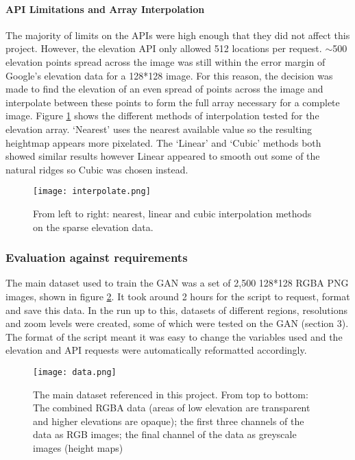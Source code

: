 \documentclass[a4paper]{report}
\begin{document}
\paragraph{API Limitations and Array Interpolation}
The majority of limits on the APIs were high enough that they did not affect this project. However, the elevation API only allowed 512 locations per request. $\sim$500 elevation points spread across the image was still within the error margin of Google's elevation data for a 128*128 image. For this reason, the decision was made to find the elevation of an even spread of points across the image and interpolate between these points to form the full array necessary for a complete image. Figure \ref{fig:interpolate} shows the different methods of interpolation tested for the elevation array. `Nearest' uses the nearest available value so the resulting heightmap appears more pixelated. The `Linear' and `Cubic' methods both showed similar results however Linear appeared to smooth out some of the natural ridges so Cubic was chosen instead.

\begin{figure}[H]
    \centering
        \texttt{[image: interpolate.png]}
        \caption{From left to right: nearest, linear and cubic interpolation methods on the sparse elevation data.}
        \label{fig:interpolate}
\end{figure}

\subsubsection{Evaluation against requirements}
The main dataset used to train the GAN was a set of 2,500 128*128 RGBA PNG images, shown in figure \ref{fig:data}. It took around 2 hours for the script to request, format and save this data. In the run up to this, datasets of different regions, resolutions and zoom levels were created, some of which were tested on the GAN (section 3). The format of the script meant it was easy to change the variables used and the elevation and API requests were automatically reformatted accordingly.

\begin{figure}[H]
    \centering
        \texttt{[image: data.png]}
        \caption{The main dataset referenced in this project. From top to bottom: The combined RGBA data (areas of low elevation are transparent and higher elevations are opaque); the first three channels of the data as RGB images; the final channel of the data as greyscale images (height maps)}
        \label{fig:data}
\end{figure}
\end{document}
